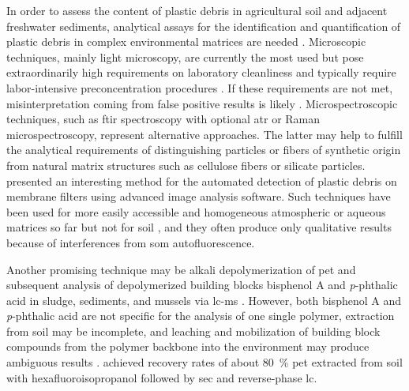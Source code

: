 In order to assess the content of plastic debris in agricultural soil and adjacent freshwater sediments, analytical assays for the identification and quantification of plastic debris in complex environmental matrices are needed \citep{BlasingPlastics2018}. Microscopic techniques, mainly light microscopy, are currently the most used but pose extraordinarily high requirements on laboratory cleanliness and typically require labor-intensive preconcentration procedures \citep{WoodallUsing2015}. If these requirements are not
met, misinterpretation coming from false positive results is likely \citep{LachenmeierMicroplastic2015}. Microspectroscopic techniques, such as \ac{ftir} spectroscopy with optional \ac{atr} or Raman microspectroscopy, represent alternative approaches. The latter may help to fulfill the analytical requirements of distinguishing particles or fibers of synthetic origin from natural matrix structures such as cellulose fibers or silicate particles. \citet{PrimpkeAutomated2017} presented an interesting method for the automated detection of plastic debris on membrane filters using advanced image analysis software. Such techniques have been used for more easily accessible and homogeneous atmospheric or aqueous matrices so far but not for soil \citep{IoakeimidisDegradation2016,FischerIdentification2015,Comnea-StancuIdentification2016}, and they often produce only qualitative results \citep{BlasingPlastics2018} because of interferences from \ac{som} autofluorescence.

Another promising technique may be alkali depolymerization of \ac{pet} and subsequent analysis of depolymerized building blocks bisphenol A and \textit{p}-phthalic acid in sludge, sediments, and mussels via \ac{lc-ms} \citep{WangSimple2017}. However, both bisphenol A and \textit{p}-phthalic acid are not specific for the analysis of one single polymer, extraction from soil may be incomplete, and leaching and mobilization of building block compounds from the polymer backbone into the environment may produce ambiguous results \citep{WangSimple2017}. \citet{ElertComparison2017} achieved recovery rates of about \SI{80}{\percent} \ac{pet} extracted from soil with hexafluoroisopropanol followed by \ac{sec} and reverse-phase \ac{lc}.

